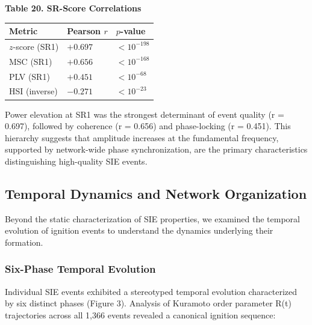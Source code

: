 \documentclass[11pt,a4paper]{article}
\begin{document}
\textbf{Table 20. SR-Score Correlations}
\begin{table}[H]
    \centering
    \begin{tabular}{lll}
        \toprule
        Metric & Pearson $r$ & $p$-value \\
        \midrule
        $z$-score (SR1) & $+0.697$ & $< 10^{-198}$ \\
        MSC (SR1) & $+0.656$ & $< 10^{-168}$ \\
        PLV (SR1) & $+0.451$ & $< 10^{-68}$ \\
        HSI (inverse) & $-0.271$ & $< 10^{-23}$ \\
        \bottomrule
    \end{tabular}  \end{table}
Power elevation at SR1 was the strongest determinant of event quality (r = 0.697), followed by coherence (r = 0.656) and phase-locking (r = 0.451). This hierarchy suggests that amplitude increases at the fundamental frequency, supported by network-wide phase synchronization, are the primary characteristics distinguishing high-quality SIE events.

\subsection{Temporal Dynamics and Network Organization}
Beyond the static characterization of SIE properties, we examined the temporal evolution of ignition events to understand the dynamics underlying their formation.

\subsubsection{Six-Phase Temporal Evolution}
Individual SIE events exhibited a stereotyped temporal evolution characterized by six distinct phases (Figure 3). Analysis of Kuramoto order parameter R(t) trajectories across all 1,366 events revealed a canonical ignition sequence:
\end{document}
